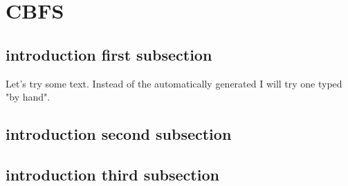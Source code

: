 \documentclass[crop=false]{standalone}
\begin{document}
\section{CBFS}

\subsection{introduction first subsection}
Let's try some text. Instead of the automatically generated
I will try one typed "by hand".

\subsection{introduction second subsection}

\blindtext

\subsection{introduction third subsection}

\blindtext
\end{document}

